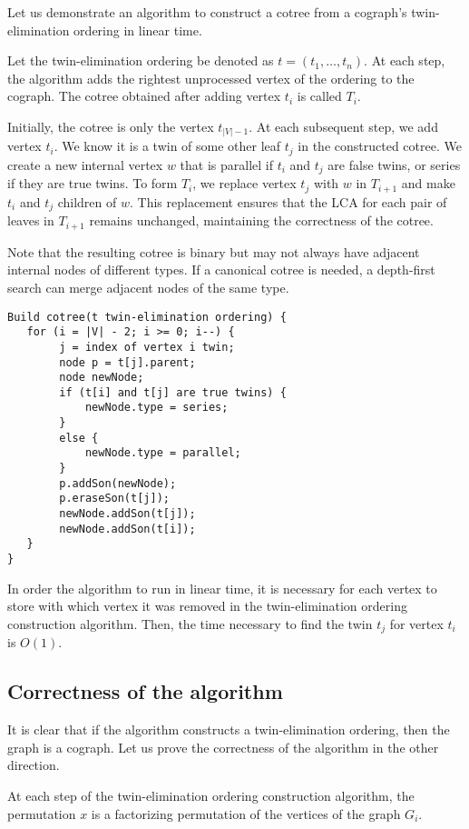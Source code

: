 Let us demonstrate an algorithm to construct a cotree from a cograph's twin-elimination ordering in linear time.

Let the twin-elimination ordering be denoted as $t=(t_1, \dots, t_n)$. At each step, the algorithm adds the rightest unprocessed vertex of the ordering to the cograph. The cotree obtained after adding vertex $t_i$ is called $T_i$.

Initially, the cotree is only the vertex  $t_{|V|-1}$. At each subsequent step, we add vertex $t_i$. We know it is a twin of some other leaf $t_j$ in the constructed cotree. We create a new internal vertex $w$ that is parallel if 
$t_i$ and $t_j$ are false twins, or series if they are true twins. To form 
$T_i$, we replace vertex $t_j$ with $w$ in $T_{i+1}$ and make $t_i$ and $t_j$ children of $w$. This replacement ensures that the LCA for each pair of leaves in $T_{i+1}$ remains unchanged, maintaining the correctness of the cotree.

Note that the resulting cotree is binary but may not always have adjacent internal nodes of different types. If a canonical cotree is needed, a depth-first search can merge adjacent nodes of the same type.

\begin{verbatim}
Build cotree(t twin-elimination ordering) {
   for (i = |V| - 2; i >= 0; i--) {
        j = index of vertex i twin;
        node p = t[j].parent;
        node newNode;
        if (t[i] and t[j] are true twins) {
            newNode.type = series;
        }
        else {
            newNode.type = parallel;
        }
        p.addSon(newNode);
        p.eraseSon(t[j]);
        newNode.addSon(t[j]);
        newNode.addSon(t[i]);
   }
}
\end{verbatim}
In order the algorithm to run in linear time, it is necessary for each vertex to store with which vertex it was removed in the twin-elimination ordering construction algorithm. Then, the time necessary to find the twin $t_j$ for vertex $t_i$ is $O(1)$. 

\subsection{Correctness of the algorithm}
It is clear that if the algorithm constructs a twin-elimination ordering, then the graph is a cograph. Let us prove the correctness of the algorithm in the other direction.

\begin{invariant}
    At each step of the twin-elimination ordering construction algorithm, the permutation $x$ is a factorizing permutation of the vertices of the graph $G_i$.
\end{invariant}

